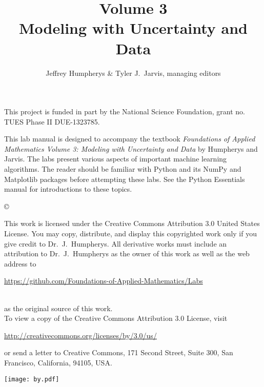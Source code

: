 \documentclass[opener-c,labs,yellow,nociteref]{HJnewsiambook}
\title{Volume 3\\ Modeling with Uncertainty and Data}
\author{Jeffrey Humpherys \& Tyler J.~Jarvis, managing editors}
\begin{document}

\thispagestyle{empty} %
\maketitle
\thispagestyle{empty}
\frontmatter


This project is funded in part by the National Science Foundation, grant no. TUES Phase II DUE-1323785.

\begin{thepreface} %

This lab manual is designed to accompany the textbook \emph{Foundations of Applied Mathematics Volume 3: Modeling with Uncertainty and Data} by Humpherys and Jarvis.
The labs present various aspects of important machine learning algorithms.
The reader should be familiar with Python \cite{vanrossum2010python} and its NumPy \cite{oliphant2006guide,ascher2001numerical,oliphant2007python} and Matplotlib \cite{Hunter:2007} packages before attempting these labs.
See the Python Essentials manual for introductions to these topics.

\vfill
\copyright{This work is licensed under the Creative Commons Attribution 3.0 United States License.
You may copy, distribute, and display this copyrighted work only if you give credit to Dr.~J.~Humpherys.
All derivative works must include an attribution to Dr.~J.~Humpherys as the owner of this work as well as the web address to
\\
\centerline{\url{https://github.com/Foundations-of-Applied-Mathematics/Labs}}
\\
as the original source of this work.
\\
To view a copy of the Creative Commons Attribution 3.0 License, visit
\\
\centerline{\url{http://creativecommons.org/licenses/by/3.0/us/}}
or send a letter to Creative Commons, 171 Second Street, Suite 300, San Francisco, California, 94105, USA.}

\vfill
\centering\texttt{[image: by.pdf]}
\vfill
\end{thepreface}

\setcounter{tocdepth}{1}
\tableofcontents

\mainmatter %
\end{document}
